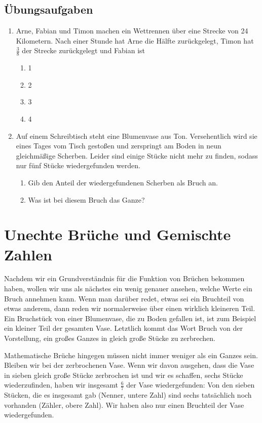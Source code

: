 \documentclass[../../main]{subfiles}
\begin{document}
\subsection*{Übungsaufgaben}
\begin{enumerate}
    \item Arne, Fabian und Timon machen ein Wettrennen über eine Strecke von 24 Kilometern. Nach einer Stunde hat Arne die Hälfte zurückgelegt, Timon hat $\frac{3}{8}$ der Strecke zurückgelegt und Fabian ist 
    \begin{enumerate}
        \item 1
        \item 2
        \item 3
        \item 4
    \end{enumerate}
    \item Auf einem Schreibtisch steht eine Blumenvase aus Ton. Versehentlich wird sie eines Tages vom Tisch gestoßen und zerspringt am Boden in neun gleichmäßige Scherben. Leider sind einige Stücke nicht mehr zu finden, sodass nur fünf Stücke wiedergefunden werden.
    \begin{enumerate}
        \item Gib den Anteil der wiedergefundenen Scherben als Bruch an.
        \item Was ist bei diesem Bruch das Ganze?
    \end{enumerate}
\end{enumerate}

\section{Unechte Brüche und Gemischte Zahlen}

Nachdem wir ein Grundverständnis für die Funktion von Brüchen bekommen haben, wollen wir uns als nächstes ein wenig genauer ansehen, welche Werte ein Bruch annehmen kann. Wenn man darüber redet, etwas sei ein Bruchteil von etwas anderem, dann reden wir normalerweise über einen wirklich kleineren Teil. Ein Bruchstück von einer Blumenvase, die zu Boden gefallen ist, ist zum Beispiel ein kleiner Teil der gesamten Vase. Letztlich kommt das Wort \glqq Bruch\grqq{} von der Vorstellung, ein großes Ganzes in gleich große Stücke zu zerbrechen.

Mathematische Brüche hingegen müssen nicht immer weniger als ein Ganzes sein. Bleiben wir bei der zerbrochenen Vase. Wenn wir davon ausgehen, dass die Vase in sieben gleich große Stücke zerbrochen ist und wir es schaffen, sechs Stücke wiederzufinden, haben wir insgesamt $\frac{6}{7}$ der Vase wiedergefunden: Von den sieben Stücken, die es insgesamt gab (Nenner, untere Zahl) sind sechs tatsächlich noch vorhanden (Zähler, obere Zahl). Wir haben also nur einen Bruchteil der Vase wiedergefunden.
\end{document}
